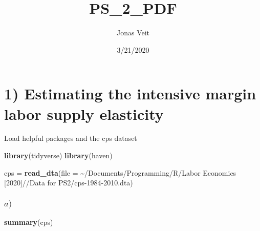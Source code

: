 \documentclass[
]{article}
\title{PS\_2\_PDF}
\author{Jonas Veit}
\date{3/21/2020}
\newenvironment{Shaded}{\begin{snugshade}}{\end{snugshade}}
\newcommand{\DataTypeTok}[1]{\textcolor[rgb]{0.13,0.29,0.53}{#1}}
\newcommand{\KeywordTok}[1]{\textcolor[rgb]{0.13,0.29,0.53}{\textbf{#1}}}
\newcommand{\NormalTok}[1]{#1}
\newcommand{\StringTok}[1]{\textcolor[rgb]{0.31,0.60,0.02}{#1}}
\begin{document}
\maketitle

\hfill\break
\hfill\break
\hfill\break

\hypertarget{estimating-the-intensive-margin-labor-supply-elasticity}{%
\section{1) Estimating the intensive margin labor supply
elasticity}\label{estimating-the-intensive-margin-labor-supply-elasticity}}

\hfill\break
\hfill\break
\hfill\break
Load helpful packages and the cps dataset

\begin{Shaded}
\begin{Highlighting}[]
\KeywordTok{library}\NormalTok{(tidyverse)}
\KeywordTok{library}\NormalTok{(haven)}

\NormalTok{cps =}\StringTok{ }\KeywordTok{read\_dta}\NormalTok{(}\DataTypeTok{file =} \StringTok{\textquotesingle{}\textasciitilde{}/Documents/Programming/R/Labor Economics [2020]//Data for PS2/cps{-}1984{-}2010.dta\textquotesingle{}}\NormalTok{)}
\end{Highlighting}
\end{Shaded}

\hfill\break
\hfill\break
\hfill\break

\hypertarget{a}{%
\subsubsection{\texorpdfstring{\(a)\)}{a)}}\label{a}}

\begin{Shaded}
\begin{Highlighting}[]
\KeywordTok{summary}\NormalTok{(cps)}
\end{Highlighting}
\end{Shaded}
\end{document}
